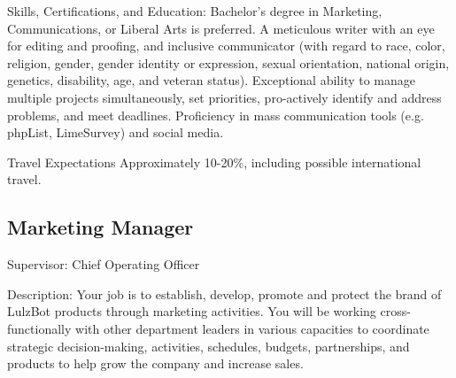Skills, Certifications, and Education:
Bachelor’s degree in Marketing, Communications, or Liberal Arts is preferred.
A meticulous writer with an eye for editing and proofing, and inclusive communicator (with regard to race, color, religion, gender, gender identity or expression, sexual orientation, national origin, genetics, disability, age, and veteran status).
Exceptional ability to manage multiple projects simultaneously, set priorities, pro-actively identify and address problems, and meet deadlines.
Proficiency in mass communication tools (e.g. phpList, LimeSurvey) and social media.

Travel Expectations
Approximately 10-20\%, including possible international travel.

\subsection{Marketing Manager}
Supervisor: Chief Operating Officer

Description: Your job is to establish, develop, promote and protect the brand of LulzBot products through marketing activities. You will be working cross-functionally with other department leaders in various capacities to coordinate strategic decision-making, activities, schedules, budgets, partnerships, and products to help grow the company and increase sales.

